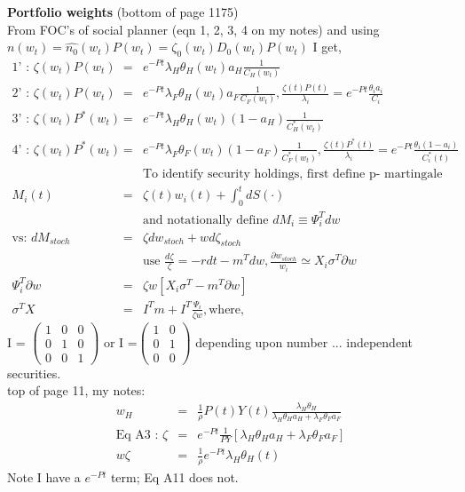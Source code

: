 \documentclass[]{article}
\begin{document}
\textbf{Portfolio weights} (bottom of page 1175)\\
From FOC's of social planner (eqn 1, 2, 3, 4 on my notes) and using $n(w_t) = \hat{n_0}(w_t)P(w_t) = \zeta_0 (w_t) D_0(w_t) P(w_t)$ I get,
\begin{eqnarray*}
\mbox{1' : } \zeta (w_t) P(w_t) &=& e^{-Pt} \lambda_H \theta_H(w_t)a_H \frac{1}{C_H(w_t)}\\
\mbox{2' : } \zeta (w_t) P(w_t) &=& e^{-Pt} \lambda_F \theta_H(w_t)a_F \frac{1}{C_F(w_t)}, \frac{\zeta(t) P(t)}{\lambda_i} = e^{-Pt} \frac{\theta_i a_i}{C_i}\\
\mbox{3' : } \zeta (w_t) P^*(w_t) &=& e^{-Pt} \lambda_H \theta_H(w_t)(1-a_H) \frac{1}{C_H^*(w_t)}\\
\mbox{4' : } \zeta (w_t) P^*(w_t) &=& e^{-Pt} \lambda_F \theta_F(w_t)(1-a_F) \frac{1}{C_F^*(w_t)}, \frac{\zeta(t) P^*(t)}{\lambda_i} = e^{-Pt} \frac{\theta_i (1-a_i)}{C^*_i(t)}\\
&& \mbox{To identify security holdings, first define p- martingale M:}\\
M_i(t) &=& \zeta (t) w_i(t) + \int_0^t dS(\cdot)\\
&& \mbox{and notationally define } dM_i \equiv \Psi_i^T dw\\
\mbox{vs: } dM_{stoch} &=& \zeta dw_{stoch} + w d\zeta_{stoch}\\
&& \mbox{use } \frac{d\zeta}{\zeta} = -rdt - m^T dw, \frac{\partial w_{stoch}}{w_i} \simeq X_i\sigma^T \partial w\\
\Psi_i^T \partial w &=& \zeta w \left[X_i \sigma^T - m^T\partial w\right]\\
\sigma^T X &=& I^Tm + I^T \frac{\Psi_i}{\zeta w}, \mbox{where,}
\end{eqnarray*}
I = $ \left( \begin{array}{ccc}
1 & 0 & 0 \\
0 & 1 & 0 \\
0 & 0 & 1 \end{array} \right)$ 
or I =$ \left( \begin{array}{cc}
1 & 0\\
0 & 1\\
0 & 0\end{array} \right)$ depending upon number ... independent securities.\\ 

top of page 11, my notes:
\begin{eqnarray*}
w_H &=& \frac{1}{\rho} P(t) Y(t) \frac{\lambda_H \theta_H}{\lambda_H \theta_H a_H + \lambda_F \theta_F a_F}\\
\mbox{Eq A3 : } \zeta &=& e^{-Pt} \frac{1}{PY} [\lambda_H \theta_H a_H + \lambda_F \theta_F a_F]\\
w\zeta &=& \frac{1}{\rho} e^{-Pt} \lambda_H \theta_H(t)
\end{eqnarray*}
Note I have a $e^{-Pt}$ term; Eq A11 does not.
\end{document}
